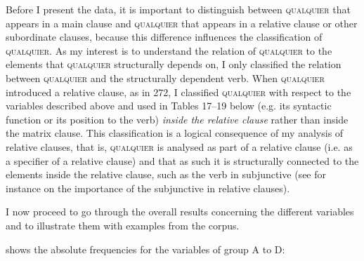   Before I present the data, it is important to distinguish between \textsc{qualquier} that appears in a main clause and \textsc{qualquier} that appears in a relative clause or other subordinate clauses, because this difference influences the classification of \textsc{qualquier}. As my interest is to understand the relation of \textsc{qualquier} to the elements that \textsc{qualquier} structurally depends on, I only classified the relation between \textsc{qualquier} and the structurally dependent verb. When \textsc{qualquier} introduced a relative clause, as in 272, I classified \textsc{qualquier} with respect to the variables described above and used in Tables 17–19 below (e.g. its syntactic function or its position to the verb) \textit{inside the relative clause} rather than inside the matrix clause. This classification is a logical consequence of my analysis of relative clauses, that is, \textsc{qualquier} is analysed as part of a relative clause (i.e. as a specifier of a relative clause) and that as such it is structurally connected to the elements inside the relative clause, such as the verb in subjunctive (see for instance \citealt{Quer2000} on the importance of the subjunctive in relative clauses).

  I now proceed to go through the overall results concerning the different variables and to illustrate them with examples from the corpus.

   shows the absolute frequencies for the variables of group A to D:

